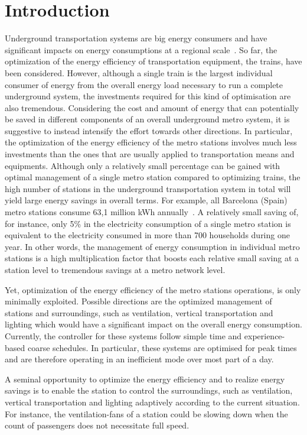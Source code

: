 \section{Introduction}
\label{sec:introduction}
Underground transportation systems are big energy consumers and have significant impacts on energy consumptions at a regional scale~\cite{anderson_maximizing_2009}. 
So far, the optimization of the energy efficiency of transportation equipment, the trains, have been considered. 
However, although a single train is the largest individual consumer of energy from the overall energy load necessary to run a complete underground system, the investments required for this kind of optimisation are also tremendous. 
Considering the cost and amount of energy that can potentially be saved in different components of an overall underground metro system, it is suggestive to instead intensify the effort towards other directions.   
In particular, the optimization of the energy efficiency of the metro stations involves much less investments than the ones that are usually applied to transportation means and equipments. 
Although only a relatively small percentage can be gained with optimal management of a single metro station compared to optimizing trains, the high number of stations in the underground transportation system in total will yield large energy savings in overall terms. 
For example, all Barcelona (Spain) metro stations consume 63,1 million kWh annually~\cite{TMB}. 
A relatively small saving of, for instance, only 5\% in the electricity consumption of a single metro station is equivalent to the electricity consumed in more than 700 households during one year.
In other words, the management of energy consumption in individual metro stations is a high multiplication factor that boosts each relative small saving at a station level to tremendous savings at a metro network level.

Yet, optimization of the energy efficiency of the metro stations operations, is only minimally exploited.
Possible directions are the optimized management of stations and surroundings, such as ventilation, vertical transportation and lighting which would have a significant impact on the overall energy consumption.
Currently, the controller for these systems follow simple time and experience-based coarse schedules. 
In particular, these systems are optimised for peak times and are therefore operating in an inefficient mode over most part of a day.

A seminal opportunity to optimize the energy efficiency and to realize energy savings is to enable the station to control the surroundings, such as ventilation, vertical transportation and lighting adaptively according to the current situation. 
For instance, the ventilation-fans of a station could be slowing down when the count of passengers does not necessitate full speed.

